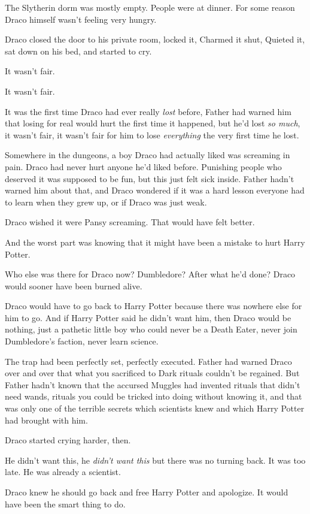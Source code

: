 The Slytherin dorm was mostly empty. People were at dinner. For some
reason Draco himself wasn't feeling very hungry.

Draco closed the door to his private room, locked it, Charmed it shut,
Quieted it, sat down on his bed, and started to cry.

It wasn't fair.

It wasn't fair.

It was the first time Draco had ever really \emph{lost} before, Father
had warned him that losing for real would hurt the first time it
happened, but he'd lost \emph{so much}, it wasn't fair, it wasn't fair
for him to lose \emph{everything} the very first time he lost.

Somewhere in the dungeons, a boy Draco had actually liked was screaming
in pain. Draco had never hurt anyone he'd liked before. Punishing people
who deserved it was supposed to be fun, but this just felt sick inside.
Father hadn't warned him about that, and Draco wondered if it was a hard
lesson everyone had to learn when they grew up, or if Draco was just
weak.

Draco wished it were Pansy screaming. That would have felt better.

And the worst part was knowing that it might have been a mistake to hurt
Harry Potter.

Who else was there for Draco now? Dumbledore? After what he'd done?
Draco would sooner have been burned alive.

Draco would have to go back to Harry Potter because there was nowhere
else for him to go. And if Harry Potter said he didn't want him, then
Draco would be nothing, just a pathetic little boy who could never be a
Death Eater, never join Dumbledore's faction, never learn science.

The trap had been perfectly set, perfectly executed. Father had warned
Draco over and over that what you sacrificed to Dark rituals couldn't be
regained. But Father hadn't known that the accursed Muggles had invented
rituals that didn't need wands, rituals you could be tricked into doing
without knowing it, and that was only one of the terrible secrets which
scientists knew and which Harry Potter had brought with him.

Draco started crying harder, then.

He didn't want this, he \emph{didn't want this} but there was no turning
back. It was too late. He was already a scientist.

Draco knew he should go back and free Harry Potter and apologize. It
would have been the smart thing to do.

